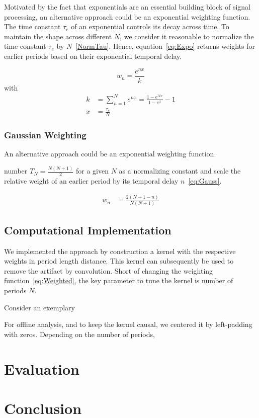\documentclass[a4paper]{article}
\begin{document}
Motivated by the fact that exponentials are an essential building block of signal processing, an alternative approach could be an exponential weighting function. The time constant $\tau_e$ of an exponential controls its decay across time. To maintain the shape across different $N$, we consider it reasonable to normalize the time constant $\tau_e$ by $N$~\eqref{NormTau}. Hence, equation~\eqref{eq:Expo} returns weights for earlier periods based on their exponential temporal delay.

\begin{equation}
    w_n = \frac{e^{nx}}{k}\label{eq:Expo}
\end{equation}
with
\begin{align}
    k   & = \sum_{n=1}^{N}e^{nx} = \frac{1-e^{Nx}}{1-e^{x}}-1\\
    x   & = \frac{\tau_e}{N}\label{eq:NormTau}
\end{align}

\subsubsection{Gaussian Weighting}

An alternative approach could be an exponential weighting function.

 number $T_N = \frac{N(N+1)}{2}$ for a given $N$ as a normalizing constant and scale the relative weight of an earlier period by its temporal delay $n$~\eqref{eq:Gauss}.

\begin{align}
    w_n & = \frac{2(N+1-n)}{N(N+1)}\label{eq:Gauss}
\end{align}

\subsection{Computational Implementation}

We implemented the approach by construction a kernel with the respective weights in period length distance. This kernel can subsequently be used to remove the artifact by convolution. Short of changing the weighting function~\eqref{eq:Weighted}, the key parameter to tune the kernel is number of periods $N$.

Consider an exemplary











 For offline analysis, and to keep the kernel causal, we centered it by left-padding with zeros.
 Depending on the number of periods,

\section{Evaluation}

\section{Conclusion}




\end{document}
